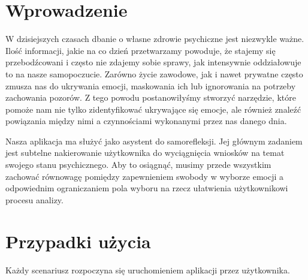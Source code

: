 \documentclass[inz, shortabstract]{iithesis}
\author         {Aleksandra Nicpoń \and Martyna Wybraniec}
\begin{document}

\chapter{Wprowadzenie}
W dzisiejszych czasach dbanie o własne zdrowie psychiczne jest niezwykle ważne. Ilość informacji, jakie na co dzień przetwarzamy powoduje, że stajemy się przebodźcowani i często nie zdajemy sobie sprawy, jak intensywnie oddziałowuje to na nasze samopoczucie. Zarówno życie zawodowe, jak i nawet prywatne często zmusza nas do ukrywania emocji, maskowania ich lub ignorowania na potrzeby zachowania pozorów. Z tego powodu postanowiłyśmy stworzyć narzędzie, które pomoże nam nie tylko zidentyfikować ukrywające się emocje, ale również znaleźć powiązania między nimi a czynnościami wykonanymi przez nas danego dnia.

Nasza aplikacja ma służyć jako asystent do samorefleksji. Jej głównym zadaniem jest subtelne nakierowanie użytkownika do wyciągnięcia wniosków na temat swojego stanu psychicznego. Aby to osiągnąć, musimy przede wszystkim zachować równowagę pomiędzy zapewnieniem swobody w wyborze emocji a odpowiednim ograniczaniem pola wyboru na rzecz ułatwienia użytkownikowi procesu analizy.

\chapter{Przypadki użycia}

Każdy scenariusz rozpoczyna się uruchomieniem aplikacji przez użytkownika.
\end{document}
